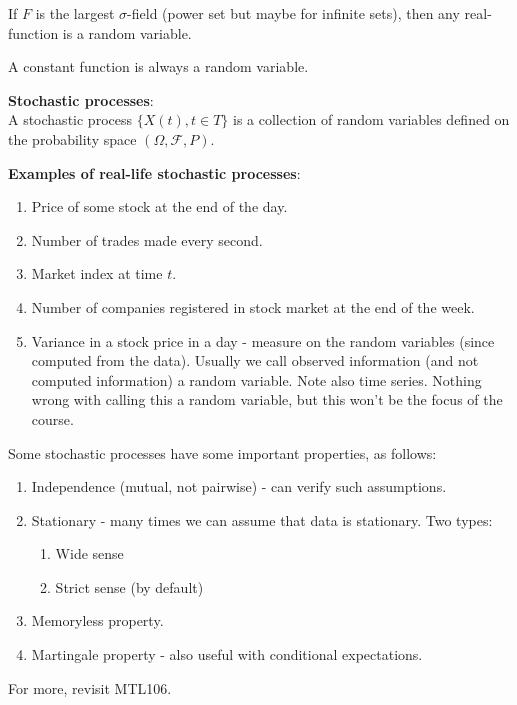 \documentclass[a4paper]{article}
\newcommand{\nl}{\vspace{0.2cm}\\}
\renewcommand{\sp}{\vspace{0.2cm}}
\newcommand{\F}{\mathcal{F}}
\begin{document}
\begin{eg}
    If $F$ is the largest $\sigma$-field (power set but maybe for infinite sets), then any real-function is a random variable.
\end{eg}
\begin{eg}
    A constant function is always a random variable.
\end{eg}
\sp
\begin{defn}
    \textbf{Stochastic processes}:\nl
    A stochastic process $\{X(t), t \in T\}$ is a collection of random variables defined on the probability space $(\Omega, \F, P)$.
\end{defn}
\sp
\begin{eg}
    \textbf{Examples of real-life stochastic processes}:
    \begin{enumerate}
    \item Price of some stock at the end of the day.
    \item Number of trades made every second.
    \item Market index at time $t$.
    \item Number of companies registered in stock market at the end of the week.
    \item Variance in a stock price in a day - measure on the random variables (since computed from the data). Usually we call observed information (and not computed information) a random
        variable. Note also time series. Nothing wrong with calling this a random variable, but this won't be the focus of the course.
    \end{enumerate}
\end{eg}
\sp
Some stochastic processes have some important properties, as follows:
\begin{enumerate}
    \item Independence (mutual, not pairwise) - can verify such assumptions.
    \item Stationary - many times we can assume that data is stationary. Two types:
        \begin{enumerate}
            \item Wide sense
            \item Strict sense (by default)
        \end{enumerate}
    \item Memoryless property.
    \item Martingale property - also useful with conditional expectations.
\end{enumerate}
For more, revisit MTL106.
\end{document}
